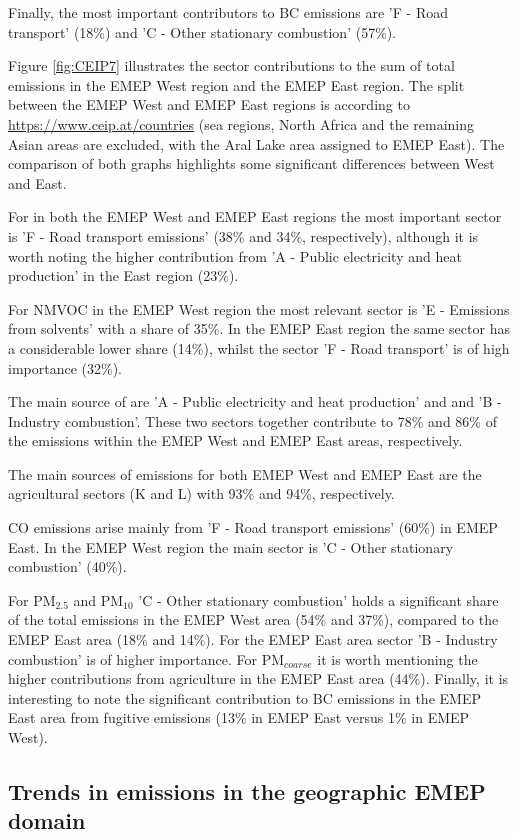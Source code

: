 Finally, the most important contributors to BC emissions are 'F - Road transport' (18\%) and 'C - Other stationary combustion' (57\%).

Figure \ref{fig:CEIP7} illustrates the
sector contributions to the sum of total emissions in the EMEP West
region and the EMEP East region. The split between the EMEP West and EMEP East regions is according to  \url{https://www.ceip.at/countries} (sea regions, North Africa and the remaining Asian areas are excluded, with the Aral Lake area assigned to EMEP East). The comparison of both graphs highlights some significant differences between West and East. 

For \nox in both the EMEP West and EMEP East regions the most important sector is 'F - Road transport emissions' (38\% and 34\%, respectively), although it is worth noting the higher contribution from  'A - Public electricity and heat production'  in the East region (23\%).

For NMVOC in the EMEP West region the most relevant sector is 'E - Emissions from solvents' with a share of 35\%. In the EMEP East region the same sector has a considerable lower share  (14\%), whilst the sector 'F - Road transport' is of high importance (32\%).

The main source of \sox are 'A - Public electricity and heat production'  and and 'B - Industry combustion'. These two sectors together contribute to 78\% and 86\%  of the \sox emissions within the EMEP West and EMEP East areas, respectively.

The main sources of \nhiii emissions for both EMEP West and EMEP East are the
agricultural sectors (K and L) with 93\% and 94\%, respectively.

CO emissions arise mainly from 'F - Road transport emissions' (60\%) in EMEP East. In the EMEP West region the main sector is 'C - Other stationary combustion' (40\%).

For PM$_{2.5}$ and PM$_{10}$ 'C - Other stationary combustion' holds a 
significant share of the total emissions in the EMEP West area (54\% and 37\%), compared to the EMEP East area (18\% and 14\%). For the
EMEP East area sector 'B - Industry combustion' is of higher importance. For PM$_{coarse}$ it is worth mentioning the higher contributions from agriculture in the EMEP East area (44\%). Finally, it is interesting to note the significant contribution to BC emissions in the EMEP East area from fugitive emissions (13\% in EMEP East versus 1\% in EMEP West). 


\subsection{Trends in emissions in the geographic EMEP domain}
\label{sec:emistrends}

